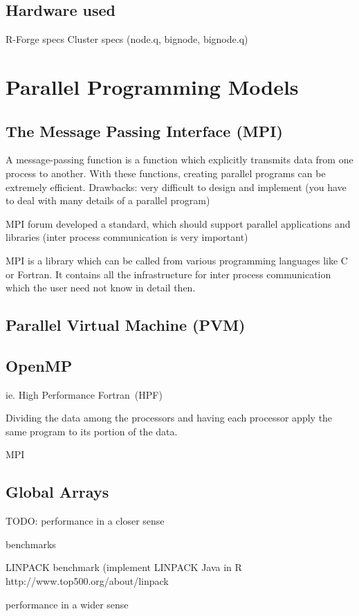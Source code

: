 \subsection{Hardware used}

R-Forge specs
Cluster specs (node.q, bignode, bignode.q)

\section{Parallel Programming Models}



\subsection{The Message Passing Interface (MPI)}
\label{MPI}

A message-passing function is a function which explicitly transmits
data from one process to another. With these
functions, creating parallel programs can be extremely efficient.
Drawbacks: very difficult to design and implement (you have to deal
with many details of a parallel program)

MPI forum developed a standard, which should support parallel
applications and libraries (inter process communication is very
important)

MPI is a library which can be called from various programming
languages like C or Fortran. It contains all the infrastructure for
inter process communication which the user need not know in detail
then. 


\subsection{Parallel Virtual Machine (PVM)}
\label{PVM}

\subsection{OpenMP}
\label{OpenMP}


ie. High Performance Fortran~(HPF)

Dividing the data among the processors and having each processor apply
the same program to its portion of the data.

MPI

\subsection{Global Arrays}
\label{globalArrays}


TODO: performance in a closer sense

      benchmarks

      LINPACK benchmark (implement LINPACK Java in R
      http://www.top500.org/about/linpack

      performance in a wider sense
